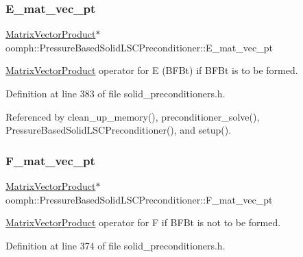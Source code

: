 \subsubsection{\texorpdfstring{E\+\_\+mat\+\_\+vec\+\_\+pt}{E\_mat\_vec\_pt}}
{\footnotesize\ttfamily \hyperlink{classoomph_1_1MatrixVectorProduct}{Matrix\+Vector\+Product}$\ast$ oomph\+::\+Pressure\+Based\+Solid\+L\+S\+C\+Preconditioner\+::\+E\+\_\+mat\+\_\+vec\+\_\+pt\hspace{0.3cm}{\ttfamily [private]}}



\hyperlink{classoomph_1_1MatrixVectorProduct}{Matrix\+Vector\+Product} operator for E (B\+F\+Bt) if B\+F\+Bt is to be formed. 



Definition at line 383 of file solid\+\_\+preconditioners.\+h.



Referenced by clean\+\_\+up\+\_\+memory(), preconditioner\+\_\+solve(), Pressure\+Based\+Solid\+L\+S\+C\+Preconditioner(), and setup().

\mbox{\label{classoomph_1_1PressureBasedSolidLSCPreconditioner_ad1ce11b9dc16c14f5eaf72eb841c08ef}} 
\subsubsection{\texorpdfstring{F\+\_\+mat\+\_\+vec\+\_\+pt}{F\_mat\_vec\_pt}}
{\footnotesize\ttfamily \hyperlink{classoomph_1_1MatrixVectorProduct}{Matrix\+Vector\+Product}$\ast$ oomph\+::\+Pressure\+Based\+Solid\+L\+S\+C\+Preconditioner\+::\+F\+\_\+mat\+\_\+vec\+\_\+pt\hspace{0.3cm}{\ttfamily [private]}}



\hyperlink{classoomph_1_1MatrixVectorProduct}{Matrix\+Vector\+Product} operator for F if B\+F\+Bt is not to be formed. 



Definition at line 374 of file solid\+\_\+preconditioners.\+h.




